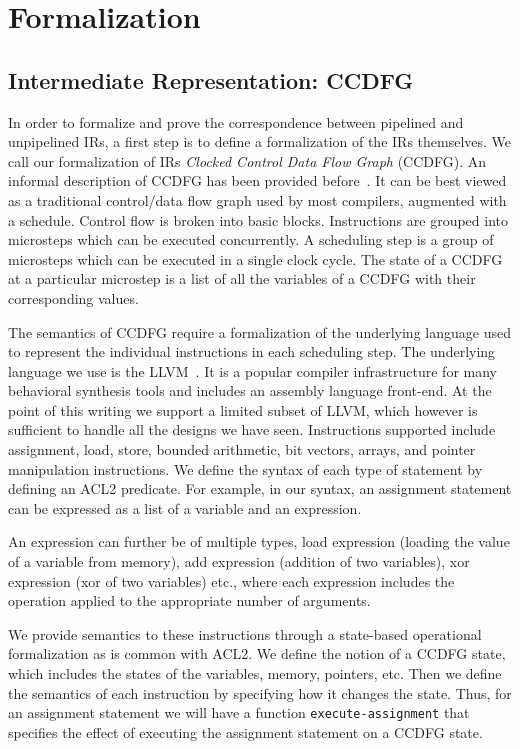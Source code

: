\chapter{Formalization}
\label{sec:formalization}

\section{Intermediate Representation: CCDFG}

In order to formalize and prove the correspondence between pipelined
and unpipelined IRs, a first step is to define a formalization of the
IRs themselves.  We call our formalization of IRs {\em Clocked Control
  Data Flow Graph} (CCDFG).  An informal description of CCDFG has been
provided before~\cite{rhcxy:atva-09}.  It can be best viewed as a
traditional control/data flow graph used by most compilers, augmented
with a schedule. Control flow is broken into basic blocks.
Instructions are grouped into microsteps which can be executed
concurrently.  A scheduling step is a group of microsteps which can be
executed in a single clock cycle. The state of a CCDFG at a particular
microstep is a list of all the variables of a CCDFG with their
corresponding values.

The semantics of CCDFG require a formalization of the
underlying language used to represent the individual
instructions in each scheduling step.  The underlying
language we use is the LLVM~\cite{llvm}.  It is a popular
compiler infrastructure for many behavioral synthesis tools
and includes an assembly language front-end.  At the point
of this writing we support a limited subset of LLVM, which
however is sufficient to handle all the designs we have
seen.  Instructions supported include assignment, load,
store, bounded arithmetic, bit vectors, arrays, and pointer
manipulation instructions.  We define the syntax of each
type of statement by defining an ACL2 predicate.  For
example, in our syntax, an assignment statement can be
expressed as a list of a variable and an
expression.

An expression can further be of multiple types, %
load
expression (loading the value of a variable from memory), add
expression (addition of two variables), xor expression (xor of two variables)
etc., where each expression includes the operation applied to the
appropriate number of arguments.

We provide semantics to these instructions through a
state-based operational formalization as is common with
ACL2.  We define the notion of a CCDFG state, which includes
the states of the variables, memory, pointers, etc.  Then we
define the semantics of each instruction by specifying how
it changes the state.  Thus, for an assignment statement we
will have a function {\tt execute-assignment} that specifies
the effect of executing the assignment statement on a CCDFG
state.

